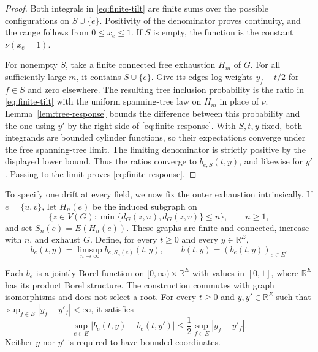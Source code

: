 \begin{proof}
Both integrals in \eqref{eq:finite-tilt} are finite sums over the
possible configurations on $S\cup\{e\}$.  Positivity of the
denominator proves continuity, and the range follows from $0\le x_e\le1$.
If $S$ is empty, the function is the constant $\nu(x_e=1)$.

For nonempty $S$, take a finite connected free exhaustion $H_m$ of $G$.
For all sufficiently large $m$, it contains $S\cup\{e\}$.  Give its
edges log weights $y_f-t/2$ for $f\in S$ and zero elsewhere.
The resulting tree inclusion probability is the ratio in
\eqref{eq:finite-tilt} with the uniform spanning-tree law on $H_m$
in place of $\nu$.  Lemma~\ref{lem:tree-response} bounds the difference
between this probability and the one using $y'$ by the right side of
\eqref{eq:finite-response}.  With $S,t,y$ fixed, both integrands
are bounded cylinder functions, so their expectations converge under
the free spanning-tree limit.  The limiting denominator is
strictly positive by the displayed lower bound.  Thus the ratios
converge to $b_{e,S}(t,y)$, and likewise for $y'$.  Passing to the
limit proves \eqref{eq:finite-response}.
\end{proof}

To specify one drift at every field, we now fix the outer exhaustion
intrinsically.  If $e=\{u,v\}$, let $H_n(e)$ be the induced subgraph
on
\[
 \{z\in V(G):\min\{d_G(z,u),d_G(z,v)\}\le n\},
 \qquad n\ge1,
\]
and set $S_n(e)=E(H_n(e))$.  These graphs are finite and connected,
increase with $n$, and exhaust $G$.  Define, for every $t\ge0$ and
every $y\in\mathbb R^{E}$,
\begin{equation}
\label{eq:drift}
 b_e(t,y)=\limsup_{n\to\infty}b_{e,S_n(e)}(t,y),
 \qquad b(t,y)=(b_e(t,y))_{e\in E}.
\end{equation}

\begin{proposition}
\label{prop:canonical-drift}
Each $b_e$ is a jointly Borel function on
$[0,\infty)\times\mathbb R^{E}$ with values in $[0,1]$, where
$\mathbb R^{E}$ has its product Borel structure.  The construction
commutes with graph isomorphisms and does not select a root.  For every
$t\ge0$ and $y,y'\in\mathbb R^{E}$ such that
$\sup_{f\in E}|y_f-y'_f|<\infty$, it satisfies
\begin{equation}
\label{eq:response-bound}
 \sup_{e\in E}|b_e(t,y)-b_e(t,y')|
 \le\frac12\sup_{f\in E}|y_f-y'_f|.
\end{equation}
Neither $y$ nor $y'$ is required to have bounded coordinates.
\end{proposition}

